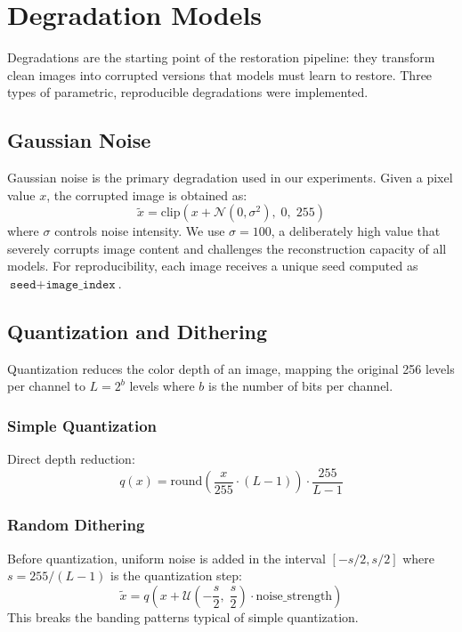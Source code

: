 \section{Degradation Models}
\label{sec:degradations}

Degradations are the starting point of the restoration pipeline: they transform clean images into corrupted versions that models must learn to restore. Three types of parametric, reproducible degradations were implemented.

\subsection{Gaussian Noise}

Gaussian noise is the primary degradation used in our experiments. Given a pixel value $x$, the corrupted image is obtained as:
\begin{equation}
\tilde{x} = \text{clip}\!\left(x + \mathcal{N}(0, \sigma^2),\; 0,\; 255\right)
\label{eq:gaussian}
\end{equation}
where $\sigma$ controls noise intensity. We use $\sigma = 100$, a deliberately high value that severely corrupts image content and challenges the reconstruction capacity of all models. For reproducibility, each image receives a unique seed computed as $\texttt{seed} + \texttt{image\_index}$.

\subsection{Quantization and Dithering}

Quantization reduces the color depth of an image, mapping the original 256 levels per channel to $L = 2^b$ levels where $b$ is the number of bits per channel.

\subsubsection{Simple Quantization}
Direct depth reduction:
\begin{equation}
q(x) = \text{round}\!\left(\frac{x}{255} \cdot (L-1)\right) \cdot \frac{255}{L-1}
\end{equation}

\subsubsection{Random Dithering}
Before quantization, uniform noise is added in the interval $[-s/2, s/2]$ where $s = 255/(L-1)$ is the quantization step:
\begin{equation}
\tilde{x} = q\!\left(x + \mathcal{U}\!\left(-\frac{s}{2},\; \frac{s}{2}\right) \cdot \text{noise\_strength}\right)
\end{equation}
This breaks the banding patterns typical of simple quantization.


